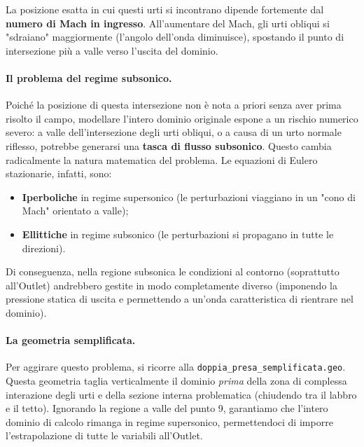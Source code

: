 La posizione esatta in cui questi urti si incontrano dipende fortemente dal \textbf{numero di Mach in ingresso}. All'aumentare del Mach, gli urti obliqui si "sdraiano" maggiormente (l'angolo dell'onda diminuisce), spostando il punto di intersezione più a valle verso l'uscita del dominio.

\paragraph{Il problema del regime subsonico.} 
Poiché la posizione di questa intersezione non è nota a priori senza aver prima risolto il campo, modellare l'intero dominio originale espone a un rischio numerico severo: a valle dell'intersezione degli urti obliqui, o a causa di un urto normale riflesso, potrebbe generarsi una \textbf{tasca di flusso subsonico}.
Questo cambia radicalmente la natura matematica del problema. Le equazioni di Eulero stazionarie, infatti, sono:
\begin{itemize}
    \item \textbf{Iperboliche} in regime supersonico (le perturbazioni viaggiano in un "cono di Mach" orientato a valle);
    \item \textbf{Ellittiche} in regime subsonico (le perturbazioni si propagano in tutte le direzioni).
\end{itemize}
Di conseguenza, nella regione subsonica le condizioni al contorno (soprattutto all'Outlet) andrebbero gestite in modo completamente diverso (imponendo la pressione statica di uscita e permettendo a un'onda caratteristica di rientrare nel dominio). 

\paragraph{La geometria semplificata.}
Per aggirare questo problema, si ricorre alla \texttt{doppia\_presa\_semplificata.geo}. Questa geometria taglia verticalmente il dominio \emph{prima} della zona di complessa interazione degli urti e della sezione interna problematica (chiudendo tra il labbro e il tetto). Ignorando la regione a valle del punto 9, garantiamo che l'intero dominio di calcolo rimanga in regime supersonico, permettendoci di imporre l'estrapolazione di tutte le variabili all'Outlet.

